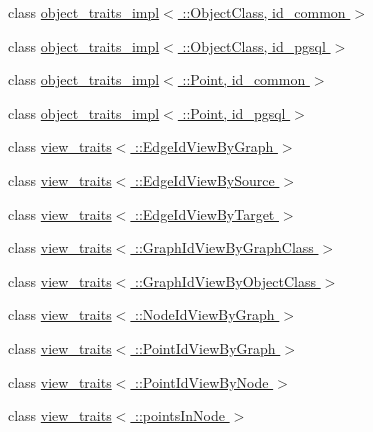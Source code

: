 \begin{DoxyCompactItemize}
\item 
class \hyperlink{classodb_1_1access_1_1object__traits__impl_3_01_1_1_object_class_00_01id__common_01_4}{object\+\_\+traits\+\_\+impl$<$ \+::\+Object\+Class, id\+\_\+common $>$}
\item 
class \hyperlink{classodb_1_1access_1_1object__traits__impl_3_01_1_1_object_class_00_01id__pgsql_01_4}{object\+\_\+traits\+\_\+impl$<$ \+::\+Object\+Class, id\+\_\+pgsql $>$}
\item 
class \hyperlink{classodb_1_1access_1_1object__traits__impl_3_01_1_1_point_00_01id__common_01_4}{object\+\_\+traits\+\_\+impl$<$ \+::\+Point, id\+\_\+common $>$}
\item 
class \hyperlink{classodb_1_1access_1_1object__traits__impl_3_01_1_1_point_00_01id__pgsql_01_4}{object\+\_\+traits\+\_\+impl$<$ \+::\+Point, id\+\_\+pgsql $>$}
\item 
class \hyperlink{classodb_1_1access_1_1view__traits_3_01_1_1_edge_id_view_by_graph_01_4}{view\+\_\+traits$<$ \+::\+Edge\+Id\+View\+By\+Graph $>$}
\item 
class \hyperlink{classodb_1_1access_1_1view__traits_3_01_1_1_edge_id_view_by_source_01_4}{view\+\_\+traits$<$ \+::\+Edge\+Id\+View\+By\+Source $>$}
\item 
class \hyperlink{classodb_1_1access_1_1view__traits_3_01_1_1_edge_id_view_by_target_01_4}{view\+\_\+traits$<$ \+::\+Edge\+Id\+View\+By\+Target $>$}
\item 
class \hyperlink{classodb_1_1access_1_1view__traits_3_01_1_1_graph_id_view_by_graph_class_01_4}{view\+\_\+traits$<$ \+::\+Graph\+Id\+View\+By\+Graph\+Class $>$}
\item 
class \hyperlink{classodb_1_1access_1_1view__traits_3_01_1_1_graph_id_view_by_object_class_01_4}{view\+\_\+traits$<$ \+::\+Graph\+Id\+View\+By\+Object\+Class $>$}
\item 
class \hyperlink{classodb_1_1access_1_1view__traits_3_01_1_1_node_id_view_by_graph_01_4}{view\+\_\+traits$<$ \+::\+Node\+Id\+View\+By\+Graph $>$}
\item 
class \hyperlink{classodb_1_1access_1_1view__traits_3_01_1_1_point_id_view_by_graph_01_4}{view\+\_\+traits$<$ \+::\+Point\+Id\+View\+By\+Graph $>$}
\item 
class \hyperlink{classodb_1_1access_1_1view__traits_3_01_1_1_point_id_view_by_node_01_4}{view\+\_\+traits$<$ \+::\+Point\+Id\+View\+By\+Node $>$}
\item 
class \hyperlink{classodb_1_1access_1_1view__traits_3_01_1_1points_in_node_01_4}{view\+\_\+traits$<$ \+::points\+In\+Node $>$}

\end{DoxyCompactItemize}
